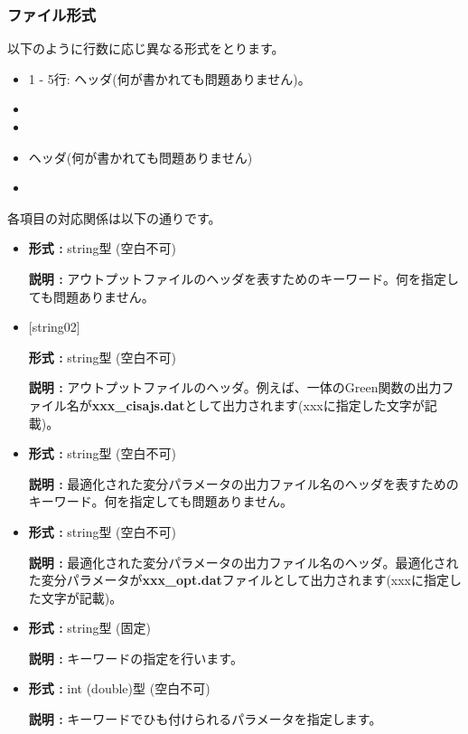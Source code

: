 \subsubsection{ファイル形式}
以下のように行数に応じ異なる形式をとります。
 \begin{itemize}
   \item  1 - 5行:  ヘッダ(何が書かれても問題ありません)。
   \item  {}
   \item  {}
   \item  {} ヘッダ(何が書かれても問題ありません)
   \item  {}
  \end{itemize}
各項目の対応関係は以下の通りです。
\begin{itemize}

   \item  \tr{$[$string01$]$}
   
   {\bf 形式 :} string型 (空白不可)

  {\bf 説明 :} アウトプットファイルのヘッダを表すためのキーワード。何を指定しても問題ありません。
   
   \item  $[$string02$]$
   
   {\bf 形式 :} string型 (空白不可)

  {\bf 説明 :} アウトプットファイルのヘッダ。例えば、一体のGreen関数の出力ファイル名が{\bf xxx\_cisajs.dat}として出力されます(xxxに指定した文字が記載)。

   \item  \tr{$[$string03$]$}
   
   {\bf 形式 :} string型 (空白不可)

  {\bf 説明 :} 最適化された変分パラメータの出力ファイル名のヘッダを表すためのキーワード。何を指定しても問題ありません。
   
   \item  \tr{$[$string04$]$}
   
   {\bf 形式 :} string型 (空白不可)

  {\bf 説明 :} 最適化された変分パラメータの出力ファイル名のヘッダ。最適化された変分パラメータが{\bf xxx\_opt.dat}ファイルとして出力されます(xxxに指定した文字が記載)。

   \item  \tr{$[$string05$]$}
   
   {\bf 形式 :} string型 (固定)

  {\bf 説明 :} キーワードの指定を行います。

   \item  \tr{$[$int01$]$ ($[$double01$]$ )}
   
   {\bf 形式 :} int (double)型 (空白不可)

  {\bf 説明 :} キーワードでひも付けられるパラメータを指定します。

  \end{itemize}

